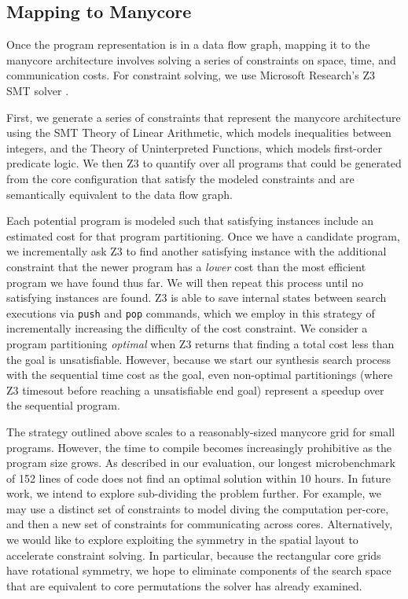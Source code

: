 \documentclass{sig-alternate-05-2015}
\begin{document}
\subsection{Mapping to Manycore}
Once the program representation is in a data flow graph, mapping it to the manycore architecture involves solving a series of constraints on space, time, and communication costs. For constraint solving, we use Microsoft Research's Z3 SMT solver \cite{z3}.

First, we generate a series of constraints that represent the manycore architecture using the SMT Theory of Linear Arithmetic, which models inequalities between integers, and the Theory of Uninterpreted Functions, which models first-order predicate logic. We then Z3 to quantify over all programs that could be generated from the core configuration that satisfy the modeled constraints and are semantically equivalent to the data flow graph. 

Each potential program is modeled such that satisfying instances include an estimated cost for that program partitioning. Once we have a candidate program, we incrementally ask Z3 to find another satisfying instance with the additional constraint that the newer program has a \emph{lower} cost than the most efficient program we have found thus far. We will then repeat this process until no satisfying instances are found. Z3 is able to save internal states between search executions via \texttt{push} and \texttt{pop} commands, which we employ in this strategy of incrementally increasing the difficulty of the cost constraint. We consider a program partitioning \emph{optimal} when Z3 returns that finding a total cost less than the goal is unsatisfiable. However, because we start our synthesis search process with the sequential time cost as the goal, even non-optimal partitionings (where Z3 timesout before reaching a unsatisfiable end goal) represent a speedup over the sequential program.

The strategy outlined above scales to a reasonably-sized manycore grid for small programs. However, the time to compile becomes increasingly prohibitive as the program size grows. As described in our evaluation, our longest microbenchmark of 152 lines of code does not find an optimal solution within 10 hours. In future work, we intend to explore sub-dividing the problem further. For example, we may use a distinct set of constraints to model diving the computation per-core, and then a new set of constraints for communicating across cores. Alternatively, we would like to explore exploiting the symmetry in the spatial layout to accelerate constraint solving. In particular, because the rectangular core grids have rotational symmetry, we hope to eliminate components of the search space that are equivalent to core permutations the solver has already examined.
\end{document}
